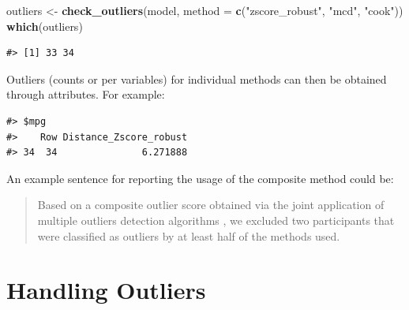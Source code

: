 \documentclass[sn-basic, lineno,pdflatex]{sn-jnl}
\newenvironment{Shaded}{\begin{snugshade}}{\end{snugshade}}
\newcommand{\AttributeTok}[1]{\textcolor[rgb]{0.13,0.29,0.53}{#1}}
\newcommand{\FunctionTok}[1]{\textcolor[rgb]{0.13,0.29,0.53}{\textbf{#1}}}
\newcommand{\NormalTok}[1]{#1}
\newcommand{\OtherTok}[1]{\textcolor[rgb]{0.56,0.35,0.01}{#1}}
\newcommand{\SpecialCharTok}[1]{\textcolor[rgb]{0.81,0.36,0.00}{\textbf{#1}}}
\newcommand{\StringTok}[1]{\textcolor[rgb]{0.31,0.60,0.02}{#1}}
\begin{document}
\begin{Shaded}
\begin{Highlighting}[]
\NormalTok{outliers }\OtherTok{\textless{}{-}} \FunctionTok{check\_outliers}\NormalTok{(model, }\AttributeTok{method =} \FunctionTok{c}\NormalTok{(}\StringTok{"zscore\_robust"}\NormalTok{, }\StringTok{"mcd"}\NormalTok{, }\StringTok{"cook"}\NormalTok{))}
\FunctionTok{which}\NormalTok{(outliers)}
\end{Highlighting}
\end{Shaded}

\begin{verbatim}
#> [1] 33 34
\end{verbatim}

Outliers (counts or per variables) for individual methods can then be
obtained through attributes. For example:

\begin{Shaded}
\end{Shaded}

\begin{verbatim}
#> $mpg
#>    Row Distance_Zscore_robust
#> 34  34               6.271888
\end{verbatim}

An example sentence for reporting the usage of the composite method
could be:

\begin{quote}
Based on a composite outlier score \citep[see the `check\_outliers()'
function in the `performance' R package,][]{ludecke2021performance}
obtained via the joint application of multiple outliers detection
algorithms \citetext{\citealp[(a) median absolute deviation (MAD)-based
robust \emph{z} scores,][]{leys2013outliers}; \citealp[(b) Mahalanobis
minimum covariance determinant (MCD),][]{leys2019outliers}; \citealp[and
(c) Cook's distance,][]{cook1977detection}}, we excluded two
participants that were classified as outliers by at least half of the
methods used.
\end{quote}

\section{Handling Outliers}\label{handling-outliers}
\end{document}
